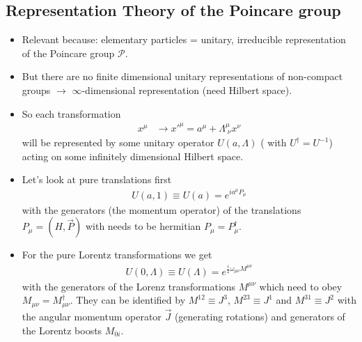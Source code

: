 \documentclass[10pt,a4paper]{book}
\theoremstyle{definition}
\begin{document}
\subsection{Representation Theory of the Poincare group}
\begin{itemize}
\item Relevant because: elementary particles  = unitary, irreducible representation of the Poincare group $\mathcal{P}$.

\item But there are no finite dimensional unitary representations of non-compact groups $\rightarrow$ $\infty$-dimensional representation (need Hilbert space).

\item So each transformation
\begin{align}
x^\mu&\rightarrow x'^{\mu}=a^\mu+\Lambda^\mu_{\;\nu}x^\nu
\end{align}
will be represented by some unitary operator $U(a,\Lambda)$ ( with $U^\dagger=U^{-1}$) acting on some infinitely dimensional Hilbert space.

\item Let's look at pure translations first
\begin{align}
U(a,1)\equiv U(a)=e^{ia^\mu P_\mu}
\end{align}
with the generators (the momentum operator) of the translations $P_\mu=(H,\vec{P})$ with needs to be hermitian $P_\mu=P^\dagger_\mu$.
\item For the pure Lorentz transformations we get
\begin{align}
U(0,\Lambda)\equiv U(\Lambda)=e^{\frac{i}{2}\omega_{\mu\nu} M^{\mu\nu}}
\end{align}
with the generators of the Lorenz transformations $M^{\mu\nu}$ which need to obey $M_{\mu\nu}=M^\dagger_{\mu\nu}$. They can be identified by $M^{12}\equiv J^3$, $M^{23}\equiv J^1$ and $M^{31}\equiv J^2$ with the angular momentum operator $\vec{J}$ (generating rotations) and generators of the Lorentz boosts $M_{0i}$.


\end{itemize}
\end{document}
